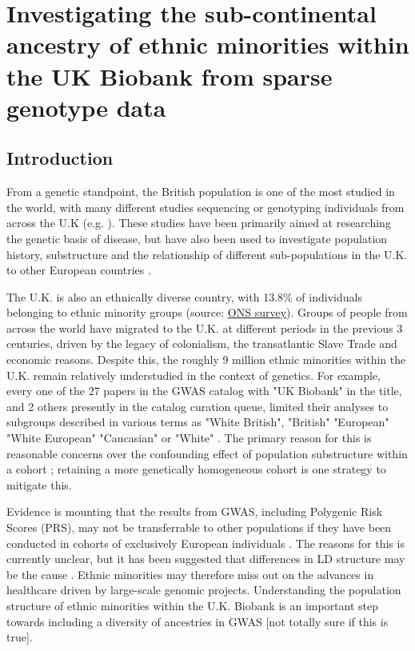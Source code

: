 \chapter{Investigating the sub-continental ancestry of ethnic minorities within the UK Biobank from sparse genotype data}
\label{chapterlabel3}

\section{Introduction}

From a genetic standpoint, the British population is one of the most studied in the world, with many different studies sequencing or genotyping individuals from across the U.K (e.g. \cite{bycroft2018uk, Leslie2015, turnbull2018introducing, uk10k2015uk10k}). These studies have been primarily aimed at researching the genetic basis of disease, but have also been used to investigate population history, substructure  and the relationship of different sub-populations in the U.K. to other European countries \cite{Leslie2015, schiffels2016iron, liu2020human}.  

The U.K. is also an ethnically diverse country, with 13.8\% of individuals belonging to ethnic minority groups (source: \href{https://www.ons.gov.uk/peoplepopulationandcommunity/populationandmigration/populationestimates/articles/researchreportonpopulationestimatesbyethnicgroupandreligion/2019-12-04}{ONS survey}). Groups of people from across the world have migrated to the U.K. at different periods in the previous 3 centuries, driven by the legacy of colonialism, the transatlantic Slave Trade and economic reasons. Despite this, the roughly 9 million ethnic minorities within the U.K. remain relatively understudied in the context of genetics. For example, every one of the 27 papers in the GWAS catalog with "UK Biobank" in the title, and 2 others presently in the catalog curation queue, limited their analyses to subgroups described in various terms as "White British", "British" "European" "White European" "Caucasian" or "White" \cite{manolio2019using}. The primary reason for this is reasonable concerns over the confounding effect of population substructure within a cohort \cite{hellwege2017population}; retaining a more genetically homogeneous cohort is one strategy to mitigate this. 

Evidence is mounting that the results from GWAS, including Polygenic Risk Scores (PRS), may not be transferrable to other populations if they have been conducted in cohorts of exclusively European individuals \cite{kuchenbaecker2019transferability, martin2017human, bustamante2011genomics}. The reasons for this is currently unclear, but it has been suggested that differences in LD structure may be the cause \cite{vilhjalmsson2015modeling}. Ethnic minorities may therefore miss out on the advances in healthcare driven by large-scale genomic projects. Understanding the population structure of ethnic minorities within the U.K. Biobank is an important step towards including a diversity of ancestries in GWAS [not totally sure if this is true]. 

